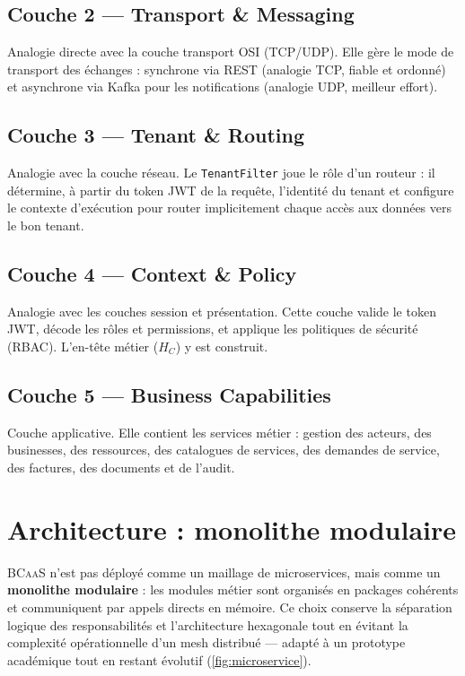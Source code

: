 \documentclass[12pt,a4paper]{report}
\theoremstyle{definition}
\theoremstyle{remark}
\newcommand{\bcaas}{\textsc{BCaaS}}
\newcommand{\jwt}{\textsc{JWT}}
\newcommand{\osi}{\textsc{OSI}}
\newcommand{\rest}{\textsc{REST}}
\begin{document}
\subsection{Couche 2 — Transport \& Messaging}
Analogie directe avec la couche transport \osi{} (TCP/UDP). Elle gère le mode de transport des échanges : synchrone via \rest{} (analogie TCP, fiable et ordonné) et asynchrone via Kafka pour les notifications (analogie UDP, meilleur effort).

\subsection{Couche 3 — Tenant \& Routing}
Analogie avec la couche réseau. Le \texttt{TenantFilter} joue le rôle d'un routeur : il détermine, à partir du token \jwt{} de la requête, l'identité du tenant et configure le contexte d'exécution pour router implicitement chaque accès aux données vers le bon tenant.

\subsection{Couche 4 — Context \& Policy}
Analogie avec les couches session et présentation. Cette couche valide le token \jwt, décode les rôles et permissions, et applique les politiques de sécurité (RBAC). L'en-tête métier ($H_C$) y est construit.

\subsection{Couche 5 — Business Capabilities}
Couche applicative. Elle contient les services métier : gestion des acteurs, des businesses, des ressources, des catalogues de services, des demandes de service, des factures, des documents et de l'audit.

\section{Architecture : monolithe modulaire}

\bcaas{} n'est pas déployé comme un maillage de microservices, mais comme un \textbf{monolithe modulaire} : les modules métier sont organisés en packages cohérents et communiquent par appels directs en mémoire. Ce choix conserve la séparation logique des responsabilités et l'architecture hexagonale tout en évitant la complexité opérationnelle d'un mesh distribué — adapté à un prototype académique tout en restant évolutif (\cref{fig:microservice}).
\end{document}
